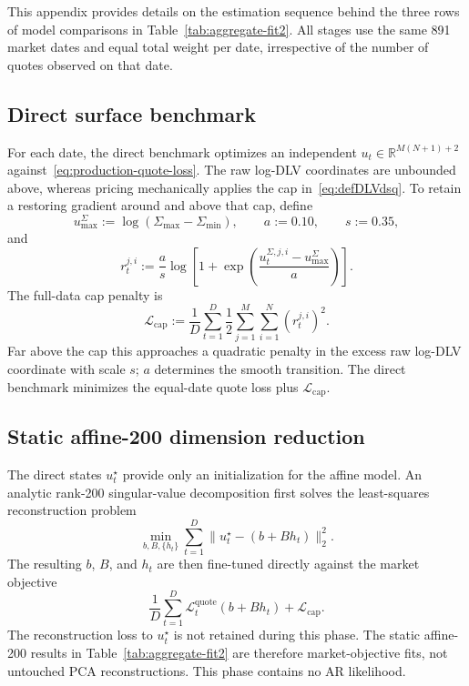 \documentclass[11pt,a4paper]{article}
\newcommand{\R}{\mathbb{R}}
\begin{document}
This appendix provides details on the estimation sequence behind the three rows of model
comparisons in Table~\ref{tab:aggregate-fit2}.  All stages use the same 891
market dates and equal total weight per date, irrespective of the number of
quotes observed on that date.

\subsection{Direct surface benchmark}

For each date, the direct benchmark optimizes an independent
$u_t\in\R^{M(N+1)+2}$ against~\eqref{eq:production-quote-loss}.  The raw
log-DLV coordinates are unbounded above, whereas pricing mechanically applies
the cap in~\eqref{eq:defDLVdsq}.  To retain a restoring gradient around and
above that cap, define
\begin{equation}
  u_{\max}^{\Sigma}:=\log(\Sigma_{\max}-\Sigma_{\min}),
  \qquad a:=0.10,
  \qquad s:=0.35,
\end{equation}
and
\begin{equation}
  r_t^{j,i}
  :=\frac{a}{s}\log\!\left[
       1+\exp\!\left(
         \frac{u_t^{\Sigma,j,i}-u_{\max}^{\Sigma}}{a}
       \right)
     \right].
\end{equation}
The full-data cap penalty is
\begin{equation}
  \mathcal L_{\mathrm{cap}}
  :=\frac1D\sum_{t=1}^{D}
       \frac12\sum_{j=1}^{M}\sum_{i=1}^{N}(r_t^{j,i})^2.
  \label{eq:dlv-cap-penalty}
\end{equation}
Far above the cap this approaches a quadratic penalty in the excess raw
log-DLV coordinate with scale $s$; $a$ determines the smooth transition.  The
direct benchmark minimizes the equal-date quote loss plus
$\mathcal L_{\mathrm{cap}}$.

\subsection{Static affine-200 dimension reduction}

The direct states $u_t^\star$ provide only an initialization for the affine
model.  An analytic rank-200 singular-value decomposition first solves the
least-squares reconstruction problem
\[
  \min_{b,B,\{h_t\}}
  \sum_{t=1}^{D}\lVert u_t^\star-(b+B h_t)\rVert_2^2.
\]
The resulting $b$, $B$, and $h_t$ are then fine-tuned directly against the
market objective
\begin{equation}
  \frac1D\sum_{t=1}^{D}
    \mathcal L_t^{\mathrm{quote}}(b+B h_t)
  +\mathcal L_{\mathrm{cap}}.
  \label{eq:static-affine-objective}
\end{equation}
The reconstruction loss to $u_t^\star$ is not retained during this phase.
The static affine-200 results in Table~\ref{tab:aggregate-fit2} are therefore
market-objective fits, not untouched PCA reconstructions.  This phase contains
no AR likelihood.
\end{document}
